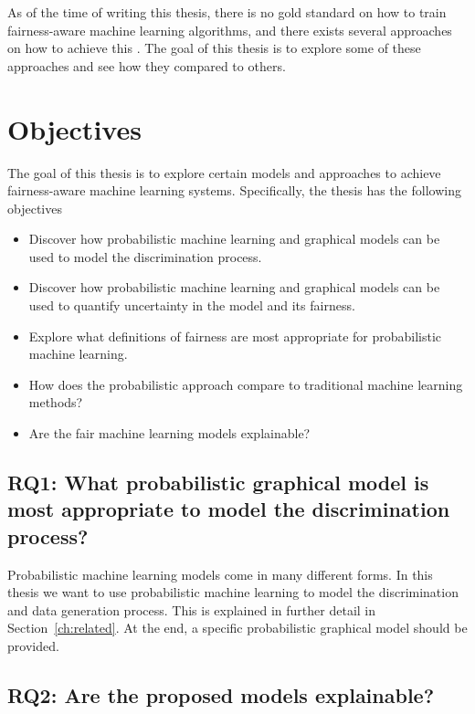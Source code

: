 As of the time of writing this thesis, there is no gold standard on how to train fairness-aware machine learning algorithms, and there exists several approaches on how to achieve this \citep{Mehrabi:2021:CSUR}. The goal of this thesis is to explore some of these approaches and see how they compared to others. 

\section{Objectives}
\label{sec:intro:objectives}

The goal of this thesis is to explore certain models and approaches to achieve fairness-aware machine learning systems. Specifically, the thesis has the following objectives

\begin{itemize}
    \item Discover how probabilistic machine learning and graphical models can be used to model the discrimination process.
    \item Discover how probabilistic machine learning and graphical models can be used to quantify uncertainty in the model and its fairness.
    \item Explore what definitions of fairness are most appropriate for probabilistic machine learning.
    \item How does the probabilistic approach compare to traditional machine learning methods?
    \item Are the fair machine learning models explainable?
\end{itemize}

\subsection{RQ1: What probabilistic graphical model is most appropriate to model the discrimination process?}

Probabilistic machine learning models come in many different forms. In this thesis we want to use probabilistic machine learning to model the discrimination and data generation process. This is explained in further detail in Section~\ref{ch:related}. At the end, a specific probabilistic graphical model should be provided.

\subsection{RQ2: Are the proposed models explainable?}

